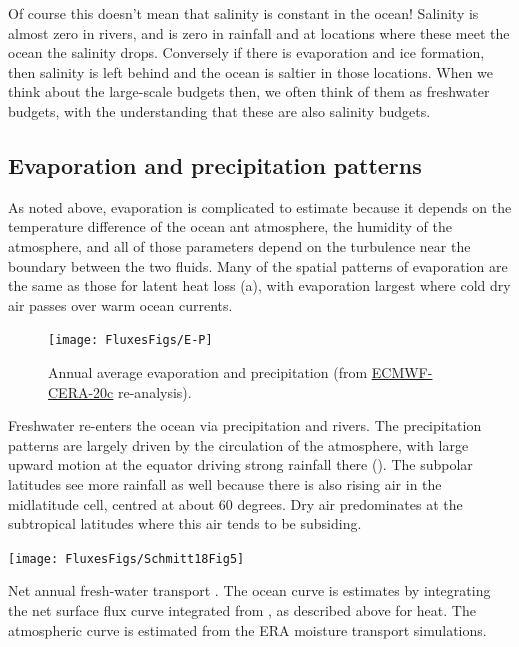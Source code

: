 Of course this doesn't mean that salinity is constant in the ocean!  Salinity is almost zero in rivers, and is zero in rainfall and at locations where these meet the ocean the salinity drops.  Conversely if there is evaporation and ice formation, then salinity is left behind and the ocean is saltier in those locations.  When we think about the large-scale budgets then, we often think of them as freshwater budgets, with the understanding that these are also salinity budgets.  

\subsection{Evaporation and precipitation patterns}

As noted above, evaporation is complicated to estimate because it depends on the temperature difference of the ocean ant atmosphere, the humidity of the atmosphere, and all of those parameters depend on the turbulence near the boundary between the two fluids. Many of the spatial patterns of evaporation are the same as those for latent heat loss (a), with evaporation largest where cold dry air passes over warm ocean currents.


\begin{figure}
\begin{center}
\texttt{[image: FluxesFigs/E-P]}
 \caption{Annual average evaporation and precipitation (from \href{https://www.ecmwf.int/en/forecasts/datasets/reanalysis-datasets/cera-20c}{ECMWF-CERA-20c} re-analysis).  }
  \label{fig:E-P}
\end{center}
\end{figure}

Freshwater re-enters the ocean via precipitation and rivers.  The precipitation patterns are largely driven by the  circulation of the atmosphere, with large upward motion at the equator driving strong rainfall there ().  The subpolar latitudes see more rainfall as well because there is also rising air in the midlatitude cell, centred at about 60 degrees.  Dry air predominates at the subtropical latitudes where this air tends to be subsiding. 

\begin{marginfigure}
\begin{center}
\texttt{[image: FluxesFigs/Schmitt18Fig5]}
 \caption{Net annual fresh-water transport \citep[from][Fig.\ 5]{Schmitt18}.  The ocean curve is estimates by integrating the net surface flux curve integrated from , as described above for heat.  The atmospheric curve is estimated from the ERA moisture transport simulations.  }
  \label{fig:Schmitt18Fig5}
\end{center}
\end{marginfigure}

